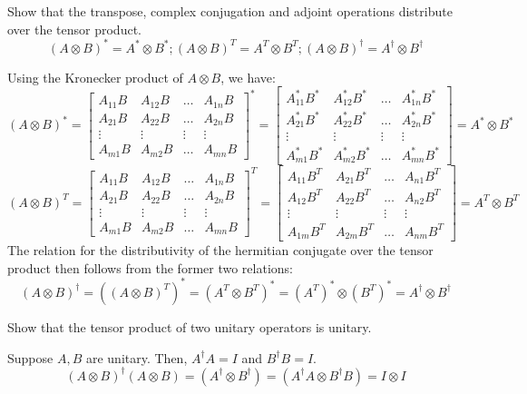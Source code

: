 \begin{example}
    Show that the transpose, complex conjugation and adjoint operations distribute over the tensor product.
    \[
    (A \otimes B)^* = A^* \otimes B^*; (A \otimes B)^T = A^T \otimes B^T ; (A \otimes B)^{\dagger} =A^{\dagger} \otimes B^{\dagger}
    \]

    Using the Kronecker product of $A \otimes B$, we have:
    \[
    (A \otimes B)^* =\begin{bmatrix} A_{11}B & A_{12}B & \ldots & A_{1n}B \\ A_{21}B & A_{22}B & \ldots & A_{2n}B \\ \vdots & \vdots & \vdots & \vdots \\ A_{m1}B & A_{m2}B & \ldots & A_{mn}B \end{bmatrix}^* = \begin{bmatrix} A_{11}^*B^* & A_{12}^*B^* & \ldots & A_{1n}^*B^* \\ A_{21}^*B^* & A_{22}^*B^* & \ldots & A_{2n}^*B^* \\ \vdots & \vdots & \vdots & \vdots \\ A_{m1}^*B^* & A_{m2}^*B^* & \ldots & A_{mn}^*B^* \end{bmatrix}=A^* \otimes B^*
    \]
    \[
    (A\otimes B)^T=\begin{bmatrix} A_{11}B & A_{12}B & \ldots & A_{1n}B \\ A_{21}B & A_{22}B & \ldots & A_{2n}B \\ \vdots & \vdots & \vdots & \vdots \\ A_{m1}B & A_{m2}B & \ldots & A_{mn}B \end{bmatrix}^T = \begin{bmatrix} A_{11}B^T & A_{21}B^T & \ldots & A_{n1}B^T \\ A_{12}B^T & A_{22}B^T & \ldots & A_{n2}B^T \\ \vdots & \vdots & \vdots & \vdots \\ A_{1m}B^T & A_{2m}B^T & \ldots & A_{nm}B^T \end{bmatrix}=A^T \otimes B^T 
    \]
    The relation for the distributivity of the hermitian conjugate over the tensor product then follows from the former two relations:
    \[
    (A \otimes B)^{\dagger}=((A\otimes B)^T)^*=(A^T\otimes B^T)^*=(A^T)^* \otimes (B^T)^*=A^{\dagger} \otimes B^{\dagger}
    \]
\end{example}
\begin{example}
Show that the tensor product of two unitary operators is unitary.

Suppose $A,B$ are unitary. Then, $A^{\dagger}A=I$ and $B^{\dagger}B=I$.
\[
(A\otimes B)^{\dagger}(A\otimes B)=(A^{\dagger} \otimes B^{\dagger})=(A^{\dagger}A \otimes B^{\dagger}B)=I\otimes I
\]
\end{example}
